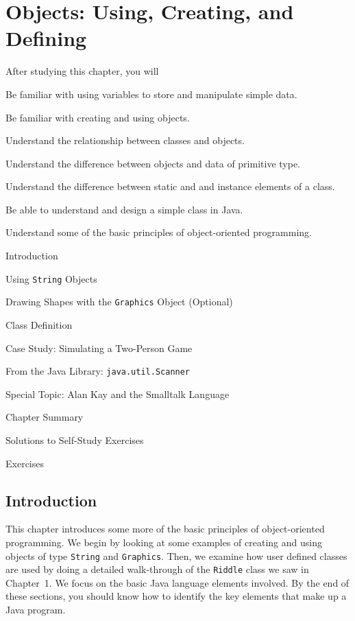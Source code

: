 
\setcounter{SSTUDYcount}{1}
\setcounter{chapter}{1}
\chapter{Objects: Using, Creating, and Defining}
\label{chapter-objects}


\CObegin
{}
\noindent After studying this chapter, you will
\begin{COBL}
\item Be familiar with using variables to store and manipulate simple data.
\item Be familiar with creating and using objects.
\item Understand the relationship between classes and objects.
\item Understand the difference between objects and data of primitive type.
\item Understand the difference between static and and instance 
elements of a class.
\item Be able to understand and design a simple class in Java.
\item Understand some of the basic principles of object-oriented programming.

\end{COBL}

\begin{COL}
\item Introduction
\item Using {\tt String} Objects
\item Drawing Shapes with the {\tt Graphics} Object (Optional)
\item Class Definition
\item Case Study: Simulating a Two-Person Game
\item {From the Java Library: {\tt java.util.Scanner}}
\item[]{{\color{cyan}Special Topic:} Alan Kay and the Smalltalk Language}
\par\small\item[] Chapter Summary
\par\small\item[] Solutions to Self-Study Exercises
\par\small\item[] Exercises
\end{COL}
\COend

\section{Introduction}
\label{introduction}
\noindent This chapter introduces some more of the basic principles of
object-oriented programming.  We begin
by looking at some examples of creating and using objects of 
type {\tt String} and {\tt Graphics}.
Then, we examine how user defined classes are used by doing a detailed
walk-through of the {\tt Riddle} class we saw in Chapter~1.
We focus on the basic Java language elements involved.  By the end of 
these sections,
you should know how to identify the key elements that make up a Java program.

